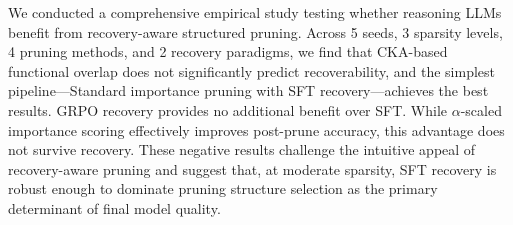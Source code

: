 \documentclass[11pt,a4paper]{article}
\begin{document}
We conducted a comprehensive empirical study testing whether reasoning LLMs benefit from recovery-aware structured pruning. Across 5 seeds, 3 sparsity levels, 4 pruning methods, and 2 recovery paradigms, we find that CKA-based functional overlap does not significantly predict recoverability, and the simplest pipeline---Standard importance pruning with SFT recovery---achieves the best results. GRPO recovery provides no additional benefit over SFT. While $\alpha$-scaled importance scoring effectively improves post-prune accuracy, this advantage does not survive recovery. These negative results challenge the intuitive appeal of recovery-aware pruning and suggest that, at moderate sparsity, SFT recovery is robust enough to dominate pruning structure selection as the primary determinant of final model quality.


\end{document}

